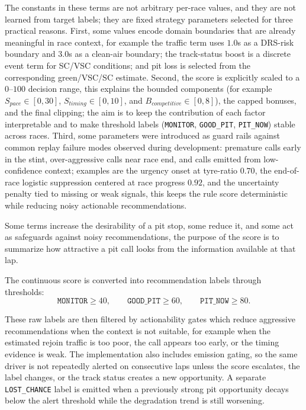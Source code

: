 The constants in these terms are not arbitrary per-race values, and they are not learned from target labels; they are fixed strategy parameters selected for three practical reasons.
First, some values encode domain boundaries that are already meaningful in race context, for example the traffic term uses $1.0$s as a DRS-risk boundary and $3.0$s as a clean-air
boundary; the track-status boost is a discrete event term for SC/VSC conditions; and pit loss is selected from the corresponding green/VSC/SC estimate.
Second, the score is explicitly scaled to a $0$--$100$ decision range, this explains the bounded components (for example $S_{pace}\in[0,30]$, $S_{timing}\in[0,10]$, and
$B_{competitive}\in[0,8]$), the capped bonuses, and the final clipping; the aim is to keep the contribution of each factor interpretable and to make threshold labels
(\texttt{MONITOR}, \texttt{GOOD\_PIT}, \texttt{PIT\_NOW}) stable across races.
Third, some parameters were introduced as guard rails against common replay failure modes observed during development: premature calls early in the stint, over-aggressive calls
near race end, and calls emitted from low-confidence context; examples are the urgency onset at tyre-ratio $0.70$, the end-of-race logistic suppression centered at race progress
$0.92$, and the uncertainty penalty tied to missing or weak signals, this keeps the rule score deterministic while reducing noisy actionable recommendations.

Some terms increase the desirability of a pit stop, some reduce it, and some act as safeguards against noisy recommendations,
the purpose of the score is to summarize how attractive a pit call looks from the information available at that lap.

The continuous score is converted into recommendation labels through thresholds:
\[
    \texttt{MONITOR} \geq 40,\qquad
    \texttt{GOOD\_PIT} \geq 60,\qquad
    \texttt{PIT\_NOW} \geq 80.
\]

These raw labels are then filtered by actionability gates which reduce aggressive recommendations when the context is not suitable, for example when the estimated
rejoin traffic is too poor, the call appears too early, or the timing evidence is weak. The implementation also includes emission gating, so the same driver is not repeatedly
alerted on consecutive laps unless the score escalates, the label changes, or the track status creates a new opportunity. A separate \texttt{LOST\_CHANCE} label is emitted when
a previously strong pit opportunity decays below the alert threshold while the degradation trend is still worsening.

